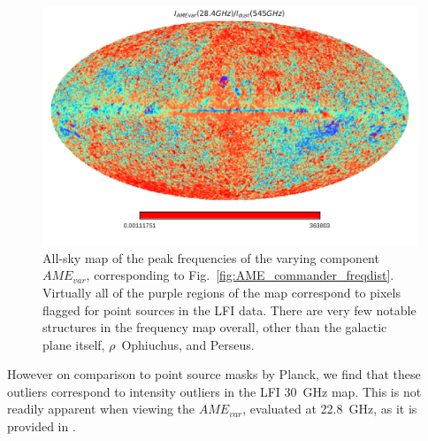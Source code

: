                \begin{figure}
                 \includegraphics[width=\textwidth]{../Plots/ch_datasources/PCAME_var_freq.pdf}
                 \centering
                 \caption{All-sky map of the peak frequencies of the varying component $AME_{var}$, corresponding to Fig.~\ref{fig:AME_commander_freqdist}. Virtually all of the purple regions of the map correspond to pixels flagged for point sources in the LFI data. There are very few notable structures in the frequency map overall, other than the galactic plane itself, $\rho$~Ophiuchus, and Perseus.}
                 \label{fig:PCAME_var_freq}
               \end{figure}
            However on comparison to point source masks by Planck, we find that these outliers correspond to intensity outliers in the LFI 30~GHz map. This is not readily apparent when viewing the $AME_{var}$, evaluated at 22.8~GHz, as it is provided in \cite{planck15X}.

